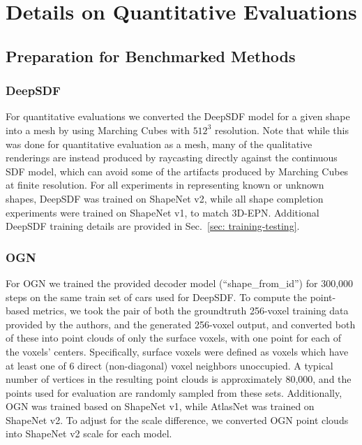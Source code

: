 \documentclass[10pt,twocolumn,letterpaper]{article}
\begin{document}
\section{Details on Quantitative Evaluations}\label{sec: quantitative}


\subsection{Preparation for Benchmarked Methods}

\subsubsection{DeepSDF}

For quantitative evaluations we converted the DeepSDF model for a given shape into a mesh by using Marching Cubes \cite{lorensen1987marching} with $512^3$ resolution.  Note that while this was done for quantitative evaluation as a mesh, many of the qualitative renderings are instead produced by raycasting directly against the continuous SDF model, which can avoid some of the artifacts produced by Marching Cubes at finite resolution.  For all experiments in representing known or unknown shapes, DeepSDF was trained on ShapeNet v2, while all shape completion experiments were trained on ShapeNet v1, to match 3D-EPN. Additional DeepSDF training details are provided in Sec.~\ref{sec: training-testing}.

\subsubsection{OGN}

For OGN we trained the provided decoder model (``shape\_from\_id'') for 300,000 steps on the same train set of cars used for DeepSDF.  To compute the point-based metrics, we took the pair of both the groundtruth 256-voxel training data provided by the authors, and the generated 256-voxel output, and converted both of these into point clouds of only the surface voxels, with one point for each of the voxels' centers.  Specifically, surface voxels were defined as voxels which have at least one of 6 direct (non-diagonal) voxel neighbors unoccupied.  A typical number of vertices in the resulting point clouds is approximately 80,000, and the points used for evaluation are randomly sampled from these sets.  Additionally, OGN was trained based on ShapeNet v1, while AtlasNet was trained on ShapeNet v2.  To adjust for the scale difference, we converted OGN point clouds into ShapeNet v2 scale for each model.
\end{document}
